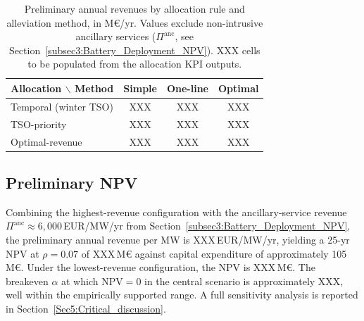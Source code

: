 \begin{table}[htbp]
\centering
\caption{Preliminary annual revenues by allocation rule and alleviation method, in M\euro/yr. Values exclude non-intrusive ancillary services ($\Pi^{\mathrm{anc}}$, see Section~\ref{subsec3:Battery_Deployment_NPV}). XXX cells to be populated from the allocation KPI outputs.}
\label{Tab:Annual_Revenue_Allocation}
\small
\begin{tabular}{lccc}
\toprule
Allocation $\backslash$ Method & Simple & One-line & Optimal \\
\midrule
Temporal (winter TSO)   & XXX & XXX & XXX \\
TSO-priority            & XXX & XXX & XXX \\
Optimal-revenue         & XXX & XXX & XXX \\
\bottomrule
\end{tabular}
\end{table}
 
\subsection{Preliminary NPV}\label{Subsec4:NPV}
 
Combining the highest-revenue configuration with the ancillary-service revenue $\Pi^{\mathrm{anc}} \approx 6{,}000$\,EUR/MW/yr from Section~\ref{subsec3:Battery_Deployment_NPV}, the preliminary annual revenue per MW is XXX\,EUR/MW/yr, yielding a 25-yr NPV at $\rho = 0.07$ of XXX\,M\euro{} against capital expenditure of approximately 105\,M\euro. Under the lowest-revenue configuration, the NPV is XXX\,M\euro. The breakeven $\alpha$ at which $\mathrm{NPV} = 0$ in the central scenario is approximately XXX, well within the empirically supported range. A full sensitivity analysis is reported in Section~\ref{Sec5:Critical_discussion}.
 

